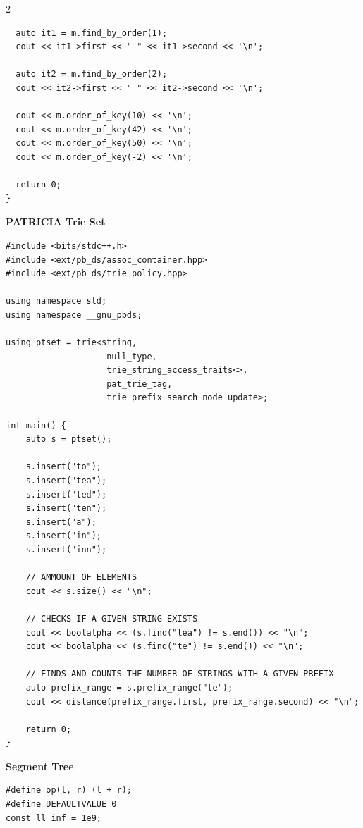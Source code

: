 \documentclass{article}
\begin{document}
\begin{multicols}{2}
\begin{lstlisting}
  auto it1 = m.find_by_order(1);
  cout << it1->first << " " << it1->second << '\n';

  auto it2 = m.find_by_order(2);
  cout << it2->first << " " << it2->second << '\n';

  cout << m.order_of_key(10) << '\n';
  cout << m.order_of_key(42) << '\n';
  cout << m.order_of_key(50) << '\n';
  cout << m.order_of_key(-2) << '\n';

  return 0;
}
\end{lstlisting}

\Large\textbf{PATRICIA Trie Set}
\begin{lstlisting}
#include <bits/stdc++.h>
#include <ext/pb_ds/assoc_container.hpp>
#include <ext/pb_ds/trie_policy.hpp>

using namespace std;
using namespace __gnu_pbds;

using ptset = trie<string,
					null_type,
					trie_string_access_traits<>,
					pat_trie_tag,
					trie_prefix_search_node_update>;

int main() {
	auto s = ptset();

	s.insert("to");
	s.insert("tea");
	s.insert("ted");
	s.insert("ten");
	s.insert("a");
	s.insert("in");
	s.insert("inn");

	// AMMOUNT OF ELEMENTS
	cout << s.size() << "\n";

	// CHECKS IF A GIVEN STRING EXISTS
	cout << boolalpha << (s.find("tea") != s.end()) << "\n";
	cout << boolalpha << (s.find("te") != s.end()) << "\n";

	// FINDS AND COUNTS THE NUMBER OF STRINGS WITH A GIVEN PREFIX
	auto prefix_range = s.prefix_range("te");
	cout << distance(prefix_range.first, prefix_range.second) << "\n";

	return 0;
}
\end{lstlisting}


\large
\Large\textbf{Segment Tree}
\large
\begin{lstlisting}	
#define op(l, r) (l + r);
#define DEFAULTVALUE 0
const ll inf = 1e9;


\end{lstlisting}
\end{multicols}
\end{document}
